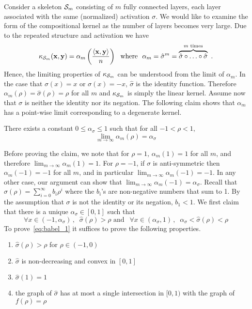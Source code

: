 Consider a
skeleton ${\cal S}_m$ consisting of $m$ fully connected layers, each layer
associated with the same (normalized) activation $\sigma$. We would like to
examine the form of the compositional kernel as the number of layers becomes
very large. Due to the repeated structure and activation we have
$$\kappa_{{\cal S}_m}({\mathbf x},{\mathbf y})=\alpha_m\left(\frac{\langle {\mathbf x},{\mathbf y} \rangle}{n}\right)
~ \mbox{ where } ~
\alpha_m = \hat{\sigma}^m =
	\overbrace{\hat{\sigma}\circ\ldots\circ\hat{\sigma}}^{m\text{ times}} ~.
$$
Hence, the limiting properties of $\kappa_{{\cal S}_m}$ can be understood from
the limit of $\alpha_m$. In the case that $\sigma(x)=x$ or $\sigma(x)=-x$,
$\hat{\sigma}$ is the identity function. Therefore $\alpha_m(\rho) =
\hat{\sigma}(\rho)=\rho$ for all $m$ and $\kappa_{{\cal S}_m}$ is simply the
linear kernel. Assume now that $\sigma$ is neither the identity nor its
negation.  The following claim shows that $\alpha_m$ has a point-wise limit
corresponding to a degenerate kernel.
\begin{claim}
There exists a constant $0\le  \alpha_{\sigma} \le 1$ such that for all
$-1 < \rho < 1$, 
\[
\lim_{m\to\infty}\alpha_m(\rho)=\alpha_{\sigma}
\]
\end{claim}
\noindent
Before proving the claim, we note that for $\rho=1$, $\alpha_m(1)=1$ for all
$m$, and therefore $\lim_{m\to\infty}\alpha_m(1)=1$. For $\rho = -1$, if
$\sigma$ is anti-symmetric then $\alpha_m(-1)=-1$ for all $m$, and in
particular $\lim_{m\to\infty}\alpha_m(-1)=-1$. In any other case, our
argument can show that $\lim_{m\to\infty}\alpha_m(-1)=\alpha_{\sigma}$.
\proof
Recall that $\hat{\sigma}(\rho) = \sum_{i=0}^\infty b_i\rho^i$ where the
$b_i$'s are non-negative numbers that sum to 1. By the assumption that
$\sigma$ is not the identity or its negation, $b_1 < 1$.  We first claim
that there is a unique $\alpha_\sigma\in [0,1]$ such that
\begin{equation}\label{eq:babel_1}
\forall x \in (-1,\alpha_\sigma)\, ,\;\;
	\hat{\sigma}(\rho) > \rho
\text{ and }~~
\forall x \in (\alpha_\sigma,1)\, ,\;\;
	\alpha_\sigma< \hat{\sigma}(\rho) < \rho
\end{equation}
To prove~\eqref{eq:babel_1} it suffices to prove the following properties.
\begin{enumerate}[label=(\alph*)]
\item $\hat{\sigma}(\rho) > \rho$ for $\rho\in (-1,0)$
\item $\hat{\sigma}$ is non-decreasing and convex in $[0,1]$
\item $\hat{\sigma}(1)=1$
\item the graph of $\hat{\sigma}$ has at most a single intersection
		in $[0,1)$ with the graph of $f(\rho)=\rho$
\end{enumerate}
